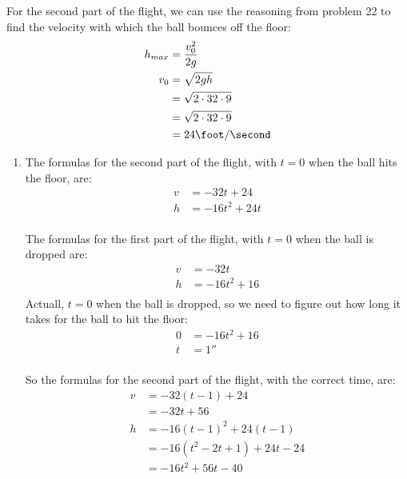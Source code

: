 \documentclass{exam}
\begin{document}
\begin{solution}
For the second part of the flight, we can use the reasoning from problem
22 to find the velocity with which the ball bounces off the floor:
\begin{align*}
  h_{max} &= \frac{v_0^2}{2g} \\
  v_0 &= \sqrt{2gh} \\
      &= \sqrt{2 \cdot 32 \cdot 9} \\
      &= \sqrt{2 \cdot 32 \cdot 9} \\
      &= 24 \foot / \second \\
\end{align*}
\begin{enumerate}[a]

\item
The formulas for the second part of the flight, with $t = 0$ when the ball hits the floor, are:
\begin{align*}
  v &= -32t + 24 \\
  h &= -16t^2 + 24t \\
\end{align*}

The formulas for the first part of the flight, with $t = 0$ when the ball is dropped are:
\begin{align*}
  v &= -32t \\
  h &= -16t^2 + 16 \\
\end{align*}
Actuall, $t = 0$ when the ball is dropped, so we need to figure out how long it takes for the ball to hit the floor:
\begin{align*}
  0 &= -16t^2 + 16 \\
  t &= 1 \second \\
\end{align*}

\pagebreak

So the formulas for the second part of the flight, with the correct time, are:
\begin{align*}
  v &= -32(t - 1) + 24 \\
    &= -32t + 56 \\
  h &= -16(t - 1)^2 + 24(t - 1) \\
    &= -16(t^2 - 2t + 1) + 24t - 24 \\
    &= -16t^2 + 56t - 40 \\
\end{align*}


\end{enumerate}
\end{solution}
\end{document}

